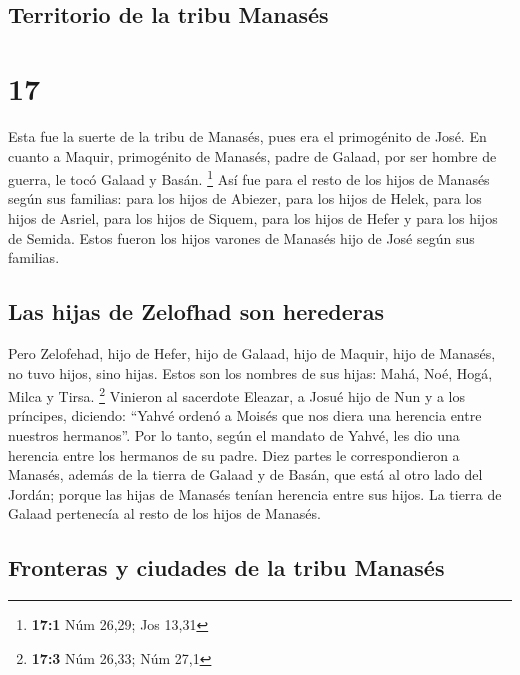 \hypertarget{territorio-de-la-tribu-manasuxe9s}{%
\subsection{Territorio de la tribu
Manasés}\label{territorio-de-la-tribu-manasuxe9s}}

\hypertarget{section-16}{%
\section{17}\label{section-16}}

 Esta fue la suerte de la tribu de Manasés, pues era el
primogénito de José. En cuanto a Maquir, primogénito de Manasés, padre
de Galaad, por ser hombre de guerra, le tocó Galaad y Basán. \footnote{\textbf{17:1}
  Núm 26,29; Jos 13,31}  Así fue para el resto de los
hijos de Manasés según sus familias: para los hijos de Abiezer, para los
hijos de Helek, para los hijos de Asriel, para los hijos de Siquem, para
los hijos de Hefer y para los hijos de Semida. Estos fueron los hijos
varones de Manasés hijo de José según sus familias.

\hypertarget{las-hijas-de-zelofhad-son-herederas}{%
\subsection{Las hijas de Zelofhad son
herederas}\label{las-hijas-de-zelofhad-son-herederas}}

 Pero Zelofehad, hijo de Hefer, hijo de Galaad, hijo de
Maquir, hijo de Manasés, no tuvo hijos, sino hijas. Estos son los
nombres de sus hijas: Mahá, Noé, Hogá, Milca y Tirsa. \footnote{\textbf{17:3}
  Núm 26,33; Núm 27,1}  Vinieron al sacerdote Eleazar, a
Josué hijo de Nun y a los príncipes, diciendo: ``Yahvé ordenó a Moisés
que nos diera una herencia entre nuestros hermanos''. Por lo tanto,
según el mandato de Yahvé, les dio una herencia entre los hermanos de su
padre.  Diez partes le correspondieron a Manasés, además
de la tierra de Galaad y de Basán, que está al otro lado del Jordán;
 porque las hijas de Manasés tenían herencia entre sus
hijos. La tierra de Galaad pertenecía al resto de los hijos de Manasés.

\hypertarget{fronteras-y-ciudades-de-la-tribu-manasuxe9s}{%
\subsection{Fronteras y ciudades de la tribu
Manasés}\label{fronteras-y-ciudades-de-la-tribu-manasuxe9s}}

